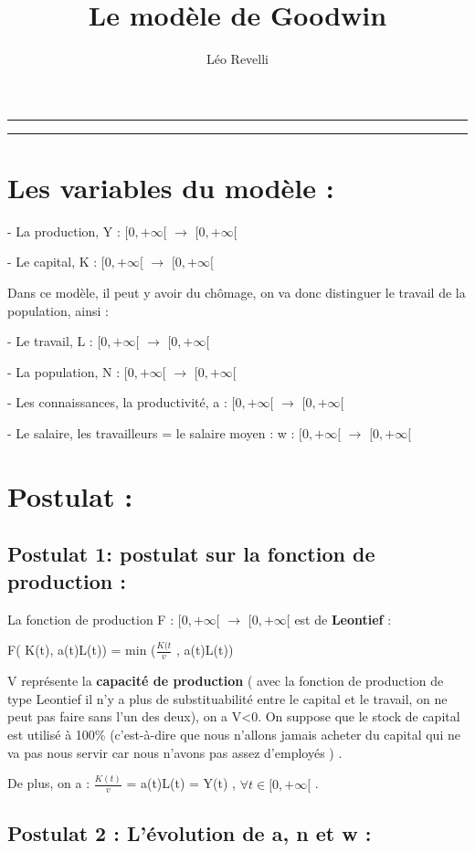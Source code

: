 \documentclass{article}
\title{Le modèle de Goodwin}
\author{Léo Revelli}
\date{}
\makeatletter
\def\maketitle{%
    \begin{center}\leavevmode
        \normalfont
        \rule[0pt]{\textwidth}{1pt}\par
        {\LARGE \@title\par}%
        {\Large \@author\par}%
        {\Large \@date\par}%
        \rule[0pt]{\textwidth}{1pt}\par
    \end{center}%
}
\makeatother
\begin{document}
\maketitle
\section{Les variables du modèle : }

- La production, Y : $[0, +\infty[$ $\longrightarrow$ $[0, +\infty[$

- Le capital, K : $[0, +\infty[$ $\longrightarrow$ $[0, +\infty[$

Dans ce modèle, il peut y avoir du chômage, on va donc distinguer le travail de la population, ainsi :

- Le travail, L : $[0, +\infty[$ $\longrightarrow$ $[0, +\infty[$

- La population, N : $[0, +\infty[$ $\longrightarrow$ $[0, +\infty[$

- Les connaissances, la productivité, a : $[0, +\infty[$ $\longrightarrow$ $[0, +\infty[$

- Le salaire, les travailleurs = le salaire moyen : w : $[0, +\infty[$ $\longrightarrow$ $[0, +\infty[$

\section{Postulat : }

\subsection{Postulat 1: postulat sur la fonction de production : }

La fonction de production F : $[0, +\infty[$ $\longrightarrow$ $[0, +\infty[$ est de \textbf{Leontief} : 

F( K(t), a(t)L(t)) = min ($\frac{K(t}{v}$ , a(t)L(t))

V représente la \textbf{capacité de production} ( avec la fonction de production de type Leontief il n'y a plus de substituabilité entre le capital et le travail, on ne peut pas faire sans l'un des deux), on a V<0. On suppose que le stock de capital est utilisé à 100\% (c'est-à-dire que nous n'allons jamais acheter du capital qui ne va pas nous servir car nous n'avons pas assez d'employés ) .

De plus, on a : $\frac{K(t)}{v}$ = a(t)L(t) = Y(t) , $\forall t \in [0, +\infty[$  .

\subsection{Postulat 2 : L'évolution de a, n et w :}
\end{document}
